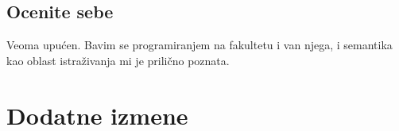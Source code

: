 \documentclass[a4paper]{report}
\begin{document}
\section{Ocenite sebe}
Veoma upućen. Bavim se programiranjem na fakultetu i van njega, i semantika kao oblast istraživanja mi je prilično poznata.


\chapter{Dodatne izmene}
\end{document}
